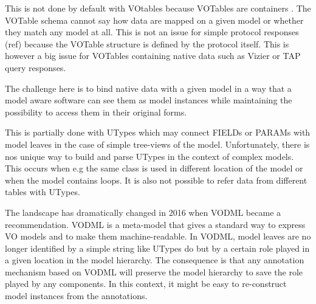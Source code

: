 \documentclass[11pt,a4paper]{ivoa}
\begin{document}
This is not done by default with VOtables because VOTables are containers \citep{2019ivoa.spec.1021O}. The VOTable schema cannot say how data are mapped on a given model or whether they match any model at all. This is not an issue for simple protocol responses (ref) because the VOTable structure is defined by the protocol itself. This is however a big issue for VOTables containing native data such as Vizier  or TAP query responses.

The challenge here is to bind native data with a given model in a way that a model aware software can see them as model instances while maintaining the possibility to access them in their original forms.

This is partially done with UTypes which may connect FIELDs or PARAMs with model leaves in the case of simple tree-views of the model. Unfortunately, there is nos unique  way to build and parse UTypes in the context of complex models. This occurs when e.g the same class is used in different location of the model or when the model contains loops. It is also not possible to refer data from different tables with  UTypes.


The landscape has dramatically changed in 2016 when VODML \citep{2018ivoa.spec.0910L} became a recommendation. VODML is a meta-model that gives a standard way to express VO models and to make them machine-readable.
In VODML, model leaves are no longer identified by a simple string like UTypes do but by a certain role played in a given location in the model hierarchy.
The consequence is that any annotation mechanism based on VODML will preserve the model hierarchy to save the role played by any components. In this context, it might be easy to re-construct model instances from the annotations. 
\end{document}
